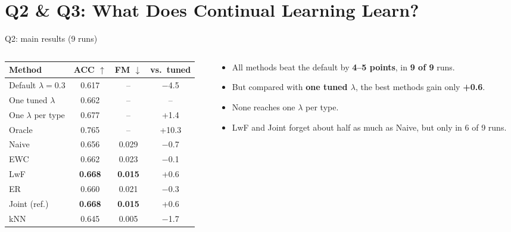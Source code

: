 \documentclass[aspectratio=169,11pt]{beamer}
\newcommand{\lam}{\lambda}
\newcommand{\strong}[1]{\textcolor{mbzuai-navy}{\textbf{#1}}}
\newcommand{\good}[1]{\textcolor{green!45!black}{\textbf{#1}}}
\newcommand{\bad}[1]{\textcolor{red!65!black}{\textbf{#1}}}
\begin{document}
\section{Q2 \& Q3: What Does Continual Learning Learn?}

\begin{frame}{Q2: main results (9 runs)}
  \begin{columns}[c,onlytextwidth]
    \begin{column}{0.56\textwidth}
      \centering
      \small
      \begin{tabular}{lccc}
        \toprule
        Method & ACC $\uparrow$ & FM $\downarrow$ & vs.\ tuned \\
        \midrule
        Default $\lam=0.3$ & 0.617 & -- & $-$4.5 \\
        \rowcolor{mbzuai-light-gray}
        One tuned $\lam$ & 0.662 & -- & -- \\
        One $\lam$ per type & 0.677 & -- & +1.4 \\
        Oracle & 0.765 & -- & +10.3 \\
        \midrule
        Naive & 0.656 & 0.029 & $-$0.7 \\
        EWC & 0.662 & 0.023 & $-$0.1 \\
        \rowcolor{mbzuai-light-gray}
        LwF & \textbf{0.668} & \textbf{0.015} & +0.6 \\
        ER & 0.660 & 0.021 & $-$0.3 \\
        Joint (ref.) & \textbf{0.668} & \textbf{0.015} & +0.6 \\
        kNN & 0.645 & 0.005 & $-$1.7 \\
        \bottomrule
      \end{tabular}
    \end{column}
    \begin{column}{0.4\textwidth}
      \begin{itemize}
        \item All methods beat the default by \good{4--5 points}, in \strong{9 of 9} runs.
        \item But compared with \strong{one tuned $\lam$}, the best methods gain only \bad{+0.6}.
        \item None reaches one $\lam$ per type.
        \item LwF and Joint forget about half as much as Naive, but only in 6 of 9 runs.
      \end{itemize}
    \end{column}
  \end{columns}
\end{frame}
\end{document}
